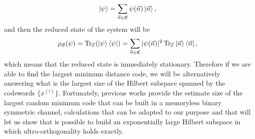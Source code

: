 \begin{equation}
\mathinner{|{\psi}\rangle} = \sum_{\vec{n}\in \mathfrak{C}}\psi(\vec{n})\mathinner{|{\vec{n}}\rangle},
\end{equation}
and then the reduced state of the system will be
\begin{equation}
\rho_{\mathcal{S}}(\psi) = \operatorname{Tr}_{\mathcal{E}}(\mathinner{|{\psi}\rangle}\mathinner{\langle{\psi}|}) = \sum_{\vec{n}\in \mathfrak{C}} |\psi(\vec{n})|^2  \operatorname{Tr}_{\mathcal{E}}\mathinner{|{\vec{n}}\rangle}\mathinner{\langle{\vec{n}}|},
\end{equation}
which means that the reduced state is immediately stationary. Therefore if we are able to find the largest minimum distance code, we will be alternatively answering what is the largest size of the Hilbert subspace spanned by the codewords $\{x^{(i)}\}$. Fortunately, previous works \cite{barg_random_2002} provide the estimate size of the largest random minimum code that can be built 
in a memoryless binary symmetric channel, calculations that can be adapted to our purpose and that will let us show that is possible to build an exponentially large Hilbert subspace in which ultra-orthogonality holds exactly.\\






